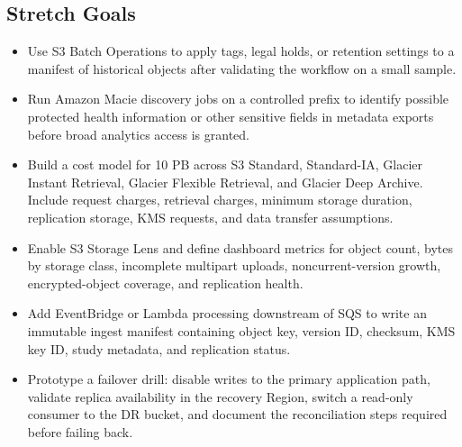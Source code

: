 \subsection*{Stretch Goals}
\begin{itemize}
    \item Use S3 Batch Operations to apply tags, legal holds, or retention settings to a manifest of historical objects after validating the workflow on a small sample.
    \item Run Amazon Macie discovery jobs on a controlled prefix to identify possible protected health information or other sensitive fields in metadata exports before broad analytics access is granted.
    \item Build a cost model for 10 PB across S3 Standard, Standard-IA, Glacier Instant Retrieval, Glacier Flexible Retrieval, and Glacier Deep Archive. Include request charges, retrieval charges, minimum storage duration, replication storage, KMS requests, and data transfer assumptions.
    \item Enable S3 Storage Lens and define dashboard metrics for object count, bytes by storage class, incomplete multipart uploads, noncurrent-version growth, encrypted-object coverage, and replication health.
    \item Add EventBridge or Lambda processing downstream of SQS to write an immutable ingest manifest containing object key, version ID, checksum, KMS key ID, study metadata, and replication status.
    \item Prototype a failover drill: disable writes to the primary application path, validate replica availability in the recovery Region, switch a read-only consumer to the DR bucket, and document the reconciliation steps required before failing back.
\end{itemize}


